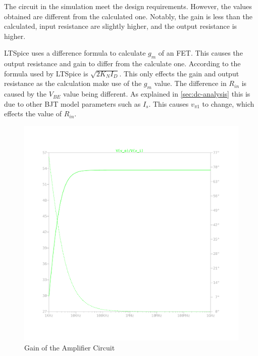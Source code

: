 \documentclass{article}
\begin{document}
The circuit in the simulation meet the design requirements.
However, the values obtained are different from the calculated one.
Notably, the gain is less than the calculated, input resistance are slightly higher, and the output resistance is higher.

LTSpice uses a difference formula to calculate $g_m$ of an FET.
This causes the output resistance and gain to differ from the calculate one.
According to \cite{ltspice-book} the formula used by LTSpice is $\sqrt{2 K_N I_D}$.
This only effects the gain and output resistance as the calculation make use of the $g_m$ value.
The difference in $R_{in}$ is caused by the $V_{BE}$ value being different.
As explained in \ref{sec:dc-analysis} this is due to other BJT model parameters such as $I_{s}$.
This causes $v_{\pi{1}}$ to change, which effects the value of $R_{in}$.

\begin{figure}[H]
    \centering
    \includegraphics[height=0.4\textheight,trim={30mm 30mm 30mm 30mm}]{img/Amplifier Design Gain.pdf}
    \caption{Gain of the Amplifier Circuit}
    \label{fig:ac-gain}
\end{figure}
\end{document}
